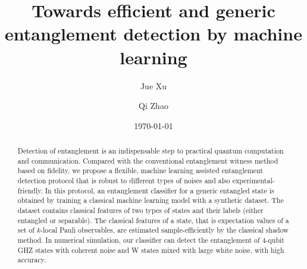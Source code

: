 \documentclass[
aps,
pra,
twocolumn,
floatfix,
]{revtex4-2}
\theoremstyle{plain}
\theoremstyle{definition}
\begin{document}
\title{Towards efficient and generic entanglement detection by machine learning}
\author{Jue Xu}
\author{Qi Zhao}
\date{\today}
\begin{abstract}
	Detection of entanglement is an indispensable step to practical quantum computation and communication. 
	Compared with the conventional entanglement witness method based on fidelity, we propose a flexible, machine learning assisted entanglement detection protocol that is robust to different types of noises and also experimental-friendly.
	In this protocol, an entanglement classifier for a generic entangled state is obtained by training a classical machine learning model with a synthetic dataset.
	The dataset contains classical features of two types of states and their labels (either entangled or separable). 
	The classical features of a state, that is expectation values of a set of $k$-local Pauli observables, are estimated sample-efficiently by the classical shadow method. 
	In numerical simulation, our classifier can detect the entanglement of 4-qubit GHZ states with coherent noise and W states mixed with large white noise, with high accuracy.
\end{abstract}

\maketitle

\end{document}
